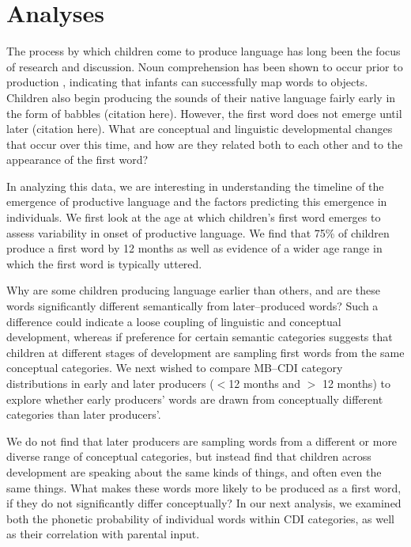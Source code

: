 \documentclass[10pt,letterpaper]{article}
\begin{document}
\section{Analyses}
The process by which children come to produce language has long been the focus of research and discussion. Noun comprehension has been shown to occur prior to production \cite{tincoff1999,tincoff2012,bergelson2012}, indicating that infants can successfully map words to objects. Children also begin producing the sounds of their native language fairly early in the form of babbles (citation here). However, the first word does not emerge until later (citation here). What are conceptual and linguistic developmental changes that occur over this time, and how are they related both to each other and to the appearance of the first word?

In analyzing this data, we are interesting in understanding the timeline of the emergence of productive language and the factors predicting this emergence in individuals. We first look at the age at which children's first word emerges to assess variability in onset of productive language. We find that 75\% of children produce a first word by 12 months as well as evidence of a wider age range in which the first word is typically uttered.

Why are some children producing language earlier than others, and are these words significantly different semantically from later--produced words? Such a difference could indicate a loose coupling of linguistic and conceptual development, whereas if preference for certain semantic categories suggests that children at different stages of development are sampling first words from the same conceptual categories. We next wished to compare MB--CDI category distributions in early and later producers ($<$12 months and $>$ 12 months) to explore whether early producers' words are drawn from conceptually different categories than later producers'.

We do not find that later producers are sampling words from a different or more diverse range of conceptual categories, but instead find that children across development are speaking about the same kinds of things, and often even the same things. What makes these words more likely to be produced as a first word, if they do not significantly differ conceptually? In our next analysis, we examined both the phonetic probability of individual words within CDI categories, as well as their correlation with parental input.
\end{document}
